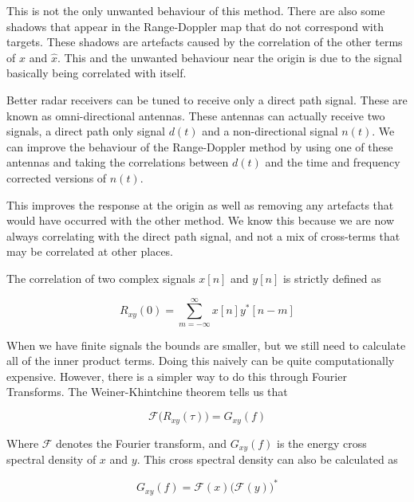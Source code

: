 \documentclass[12pt,openany,a4paper]{book}
\begin{document}
This is not the only unwanted behaviour of this method. There are also some shadows that appear in the Range-Doppler map that do not correspond with targets. These shadows are artefacts caused by the correlation of the other terms of $x$ and $\hat{x}$. This and the unwanted behaviour near the origin is due to the signal basically being correlated with itself.

\bigskip

Better radar receivers can be tuned to receive only a direct path signal. These are known as omni-directional antennas. These antennas can actually receive two signals, a direct path only signal $d(t)$ and a non-directional signal $n(t)$. We can improve the behaviour of the Range-Doppler method by using one of these antennas and taking the correlations between $d(t)$ and the time and frequency corrected versions of $n(t)$.

\bigskip

This improves the response at the origin as well as removing any artefacts that would have occurred with the other method. We know this because we are now always correlating with the direct path signal, and not a mix of cross-terms that may be correlated at other places.

\bigskip

The correlation of two complex signals $x[n]$ and $y[n]$ is strictly defined as

\begin{equation}
R_{xy}(0) = \sum_{m=-\infty}^{\infty} x[n] y^*[n-m]
\end{equation}

\bigskip

When we have finite signals the bounds are smaller, but we still need to calculate all of the inner product terms. Doing this naively can be quite computationally expensive. However, there is a simpler way to do this through Fourier Transforms. The Weiner-Khintchine theorem tells us that 

\begin{equation}
\mathcal{F} \bigg(R_{xy}(\tau) \bigg) = G_{xy}(f)
\end{equation}

\bigskip

Where $\mathcal{F}$ denotes the Fourier transform, and $G_{xy}(f)$ is the energy cross spectral density of $x$ and $y$. This cross spectral density can also be calculated as 

\begin{equation}
G_{xy}(f) = \mathcal{F}(x) \bigg(\mathcal{F}(y)\bigg)^*
\end{equation}
\end{document}
